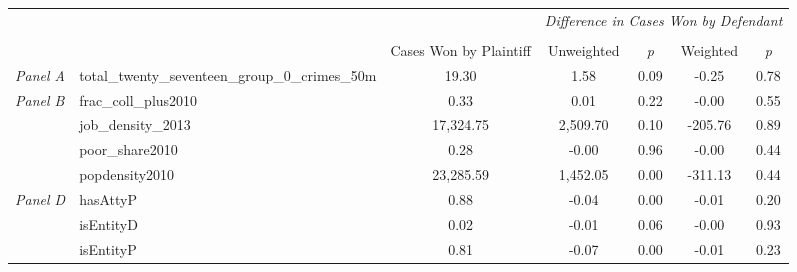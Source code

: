 \begin{tabular}{llccccc}
\toprule
 &  & \textit{} & \multicolumn{4}{c}{\textit{Difference in Cases Won by Defendant}} \\
\cline{4-7}
\\
 &  & Cases Won by Plaintiff & Unweighted & \emph{p} & Weighted & \emph{p} \\
\midrule
\textit{Panel A} & total_twenty_seventeen_group_0_crimes_50m & 19.30 & 1.58 & 0.09 & -0.25 & 0.78 \\
\cline{1-7}
\multirow[c]{4}{3cm}{\textit{Panel B}} & frac_coll_plus2010 & 0.33 & 0.01 & 0.22 & -0.00 & 0.55 \\
 & job_density_2013 & 17,324.75 & 2,509.70 & 0.10 & -205.76 & 0.89 \\
 & poor_share2010 & 0.28 & -0.00 & 0.96 & -0.00 & 0.44 \\
 & popdensity2010 & 23,285.59 & 1,452.05 & 0.00 & -311.13 & 0.44 \\
\cline{1-7}
\multirow[c]{3}{3cm}{\textit{Panel D}} & hasAttyP & 0.88 & -0.04 & 0.00 & -0.01 & 0.20 \\
 & isEntityD & 0.02 & -0.01 & 0.06 & -0.00 & 0.93 \\
 & isEntityP & 0.81 & -0.07 & 0.00 & -0.01 & 0.23 \\
\cline{1-7}
\bottomrule
\end{tabular}
